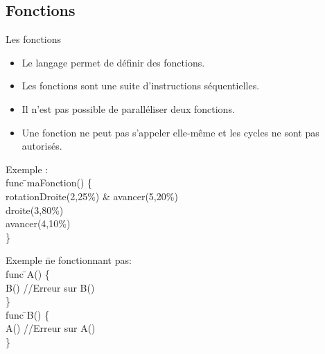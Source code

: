 \documentclass{bredelebeamer}
\begin{document}
	\subsection{Fonctions} 
\begin{frame}{Les fonctions} 
\begin{itemize}
\item Le langage permet de définir des fonctions.
\item Les fonctions sont une suite d'instructions séquentielles.
\item Il n'est pas possible de paralléliser deux fonctions.
\item Une fonction ne peut pas s'appeler elle-même et les cycles ne sont pas autorisés.
\end{itemize}


\begin{tabbing}
Exemple : \=\\
	\>\color{Framarouge}func \=\color{black}maFonction\color{Framarouge}() \{\\ 
	\>\>\color{Framarouge}rotationDroite(\color{black}2\color{Framarouge},\color{Framagris}25\%\color{Framarouge}) \& 
	\color{Framarouge}avancer(\color{black}5\color{Framarouge},\color{Framagris}20\%\color{Framarouge})\\ 
	\>\>\color{Framarouge}droite(\color{black}3\color{Framarouge},\color{Framagris}80\%\color{Framarouge})\\ 
	\>\>\color{Framarouge}avancer(\color{black}4\color{Framarouge},\color{Framagris}10\%\color{Framarouge})\\ 
	\>\color{Framarouge}\}
\end{tabbing}
\begin{tabbing}
Exemple \=ne fonctionnant pas: \\
	\>\color{Framarouge}func \=\color{black}A\color{Framarouge}() \{\\ 
	\>\>\color{Framarouge}B() \color{black} //Erreur sur B() \\
	\>\color{Framarouge}\} \\
	\>\color{Framarouge}func \=\color{black}B\color{Framarouge}() \{\\ 
	\>\>\color{Framarouge}A()  \color{black} //Erreur sur A()\\
	\>\color{Framarouge}\}
\end{tabbing}

\end{frame}
\end{document}
